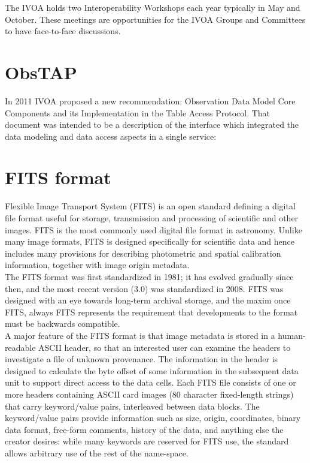 The IVOA holds two Interoperability Workshops each year typically in May and October. These meetings are opportunities for the IVOA Groups and Committees to have face-to-face discussions.

\section{ObsTAP}

In 2011 IVOA proposed a new recommendation: Observation Data Model Core Components and its Implementation in the Table Access Protocol. That document was intended to be a description of the interface which integrated the data modeling and data access aspects in a single service:\\ 



\section{FITS format}
 
Flexible Image Transport System (FITS) is an open standard defining a digital file format useful for storage, transmission and processing of scientific and other images. FITS is the most commonly used digital file format in astronomy. Unlike many image formats, FITS is designed specifically for scientific data and hence includes many provisions for describing photometric and spatial calibration information, together with image origin metadata.\\

The FITS format was first standardized in 1981; it has evolved gradually since then, and the most recent version (3.0) was standardized in 2008. FITS was designed with an eye towards long-term archival storage, and the maxim once FITS, always FITS represents the requirement that developments to the format must be backwards compatible.\\
 
A major feature of the FITS format is that image metadata is stored in a human-readable ASCII header, so that an interested user can examine the headers to investigate a file of unknown provenance. The information in the header is designed to calculate the byte offset of some information in the subsequent data unit to support direct access to the data cells. Each FITS file consists of one or more headers containing ASCII card images (80 character fixed-length strings) that carry keyword/value pairs, interleaved between data blocks. The keyword/value pairs provide information such as size, origin, coordinates, binary data format, free-form comments, history of the data, and anything else the creator desires: while many keywords are reserved for FITS use, the standard allows arbitrary use of the rest of the name-space.\\
 
